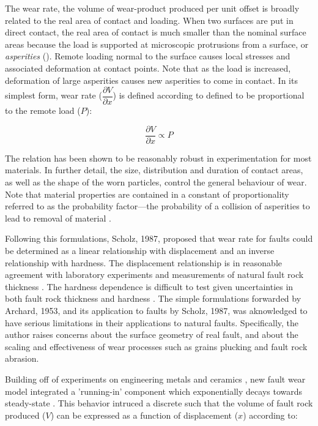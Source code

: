 \documentclass[12pt,a4paper]{article}
\begin{document}
The wear rate, the volume of wear-product produced per unit offset is broadly related to the real area of contact and loading. When two surfaces are put in direct contact, the real area of contact is much smaller than the nominal surface areas because the load is supported at microscopic protrusions from a surface, or \textit{asperities} (\cite{archard1953contact, greenwood1966contact, bowden2001friction, dieterich1996imaging}). Remote loading normal to the surface causes local stresses and associated deformation at contact points. Note that as the load is increased, deformation of large asperities causes new asperities to come in contact. In its simplest form, wear rate ($\dfrac{\partial V}{\partial x}$) is defined according to defined to be proportional to the remote load ($P$):

\begin{equation}
\dfrac{\partial V}{\partial x}\varpropto P
\end{equation}

The relation has been shown to be reasonably robust in experimentation for most materials. In further detail, the size, distribution and duration of contact areas, as well as the shape of the worn particles, control the general behaviour of wear. Note that material properties are contained in a constant of proportionality referred to as the probability factor—the probability of a collision of asperities to lead to removal of material \cite{archard1953contact}.

	Following this formulations, Scholz, 1987, proposed that wear rate for faults could be determined as a linear relationship with displacement and an inverse relationship with hardness. The displacement relationship is in reasonable agreement with laboratory experiments \cite{yoshioka1986fracture} and measurements of natural fault rock thickness \cite{robertson1982continuous, shipton2006thick}. The hardness dependence is difficult to test given uncertainties in both fault rock thickness and hardness \cite{scholz1987wear}. The simple formulations forwarded by Archard, 1953, and its application to faults by Scholz, 1987, was aknowledged to have serious limitations in their applications to natural faults. Specifically, the author raises concerns about the surface geometry of real fault, and about the scaling and effectiveness of wear processes such as grains plucking and fault rock abrasion.

   Building off of experiments on engineering metals \cite{queener1965transient} and ceramics \cite{levy1988unlubricated}, new fault wear model integrated a 'running-in' component which exponentially decays towards steady-state \cite{power1988roughness, wang1994wear}. This behavior intruced a discrete such that the volume of fault rock produced ($V$) can be expressed as a function of displacement ($x$) according to:
   
\end{document}
